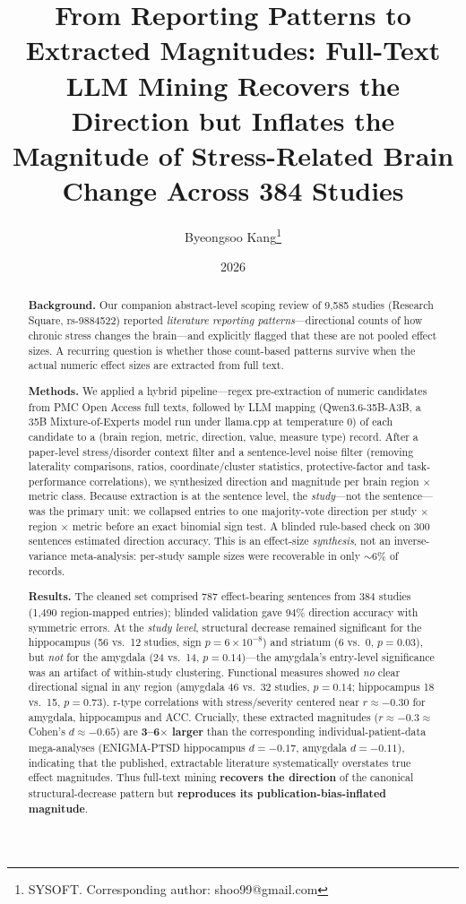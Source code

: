 \documentclass[11pt]{article}
\title{From Reporting Patterns to Extracted Magnitudes: Full-Text LLM Mining
Recovers the Direction but Inflates the Magnitude of Stress-Related Brain Change
Across 384 Studies}
\author{Byeongsoo Kang\thanks{SYSOFT. Corresponding author: shoo99@gmail.com}}
\date{2026}
\begin{document}
\maketitle

\begin{abstract}
\textbf{Background.} Our companion abstract-level scoping review of 9{,}585
studies (Research Square, rs-9884522) reported \emph{literature reporting
patterns}---directional counts of how chronic stress changes the brain---and
explicitly flagged that these are not pooled effect sizes. A recurring question
is whether those count-based patterns survive when the actual numeric effect
sizes are extracted from full text.

\textbf{Methods.} We applied a hybrid pipeline---regex pre-extraction of
numeric candidates from PMC Open Access full texts, followed by LLM mapping
(Qwen3.6-35B-A3B, a 35B Mixture-of-Experts model run under llama.cpp at
temperature 0) of each candidate to a (brain region, metric, direction, value,
measure type) record. After a paper-level stress/disorder context filter and a
sentence-level noise filter (removing laterality comparisons, ratios,
coordinate/cluster statistics, protective-factor and task-performance
correlations), we synthesized direction and magnitude per brain region $\times$
metric class. Because extraction is at the sentence level, the \emph{study}---not
the sentence---was the primary unit: we collapsed entries to one majority-vote
direction per study $\times$ region $\times$ metric before an exact binomial
sign test. A blinded rule-based check on 300 sentences estimated direction
accuracy. This is an effect-size \emph{synthesis}, not an inverse-variance
meta-analysis: per-study sample sizes were recoverable in only $\sim$6\% of
records.

\textbf{Results.} The cleaned set comprised 787 effect-bearing sentences from 384
studies (1{,}490 region-mapped entries); blinded validation gave 94\% direction
accuracy with symmetric errors. At the \emph{study level}, structural decrease
remained significant for the hippocampus (56 vs.\ 12 studies, sign
$p=6\times10^{-8}$) and striatum (6 vs.\ 0, $p=0.03$), but \emph{not} for the
amygdala (24 vs.\ 14, $p=0.14$)---the amygdala's entry-level significance was an
artifact of within-study clustering. Functional measures showed \emph{no} clear
directional signal in any region (amygdala 46 vs.\ 32 studies, $p=0.14$;
hippocampus 18 vs.\ 15, $p=0.73$). r-type correlations with stress/severity
centered near $r\approx-0.30$ for amygdala, hippocampus and ACC. Crucially, these
extracted magnitudes ($r\approx-0.3 \approx$ Cohen's $d\approx-0.65$) are
\textbf{3--6$\times$ larger} than the corresponding individual-patient-data
mega-analyses (ENIGMA-PTSD hippocampus $d=-0.17$, amygdala $d=-0.11$), indicating
that the published, extractable literature systematically overstates true effect
magnitudes. Thus full-text mining \textbf{recovers the direction} of the
canonical structural-decrease pattern but \textbf{reproduces its
publication-bias-inflated magnitude}.


\end{abstract}
\end{document}
